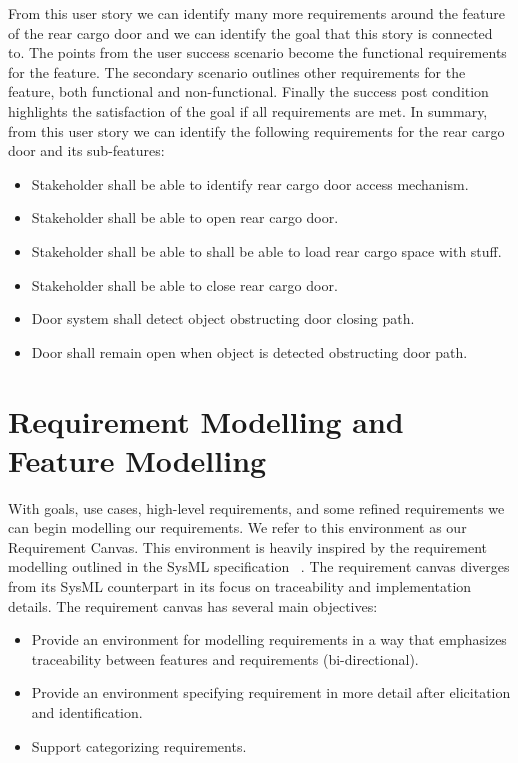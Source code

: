 From this user story we can identify many more requirements around the feature of the rear cargo door and we can identify the goal that this story is connected to. The points from the user success scenario become the functional requirements for the feature. The secondary scenario outlines other requirements for the feature, both functional and non-functional. Finally the success post condition highlights the satisfaction of the goal if all requirements are met. In summary, from this user story we can identify the following requirements for the rear cargo door and its sub-features:
\begin{itemize}
	\item Stakeholder shall be able to identify rear cargo door access mechanism.
	\item Stakeholder shall be able to open rear cargo door.
	\item Stakeholder shall be able to shall be able to load rear cargo space with stuff.
	\item Stakeholder shall be able to close rear cargo door.
	\item Door system shall detect object obstructing door closing path. 
	\item Door shall remain open when object is detected obstructing door path.
\end{itemize}

\section{Requirement Modelling and Feature Modelling}

With goals, use cases, high-level requirements, and some refined requirements we can begin modelling our requirements. We refer to this environment as our Requirement Canvas. This environment is heavily inspired by the requirement modelling outlined in the SysML specification ~\cite{sysml2019omg}. The requirement canvas diverges from its SysML counterpart in its focus on traceability and implementation details. The requirement canvas has several main objectives:
\begin{itemize}
	\item Provide an environment for modelling requirements in a way that emphasizes traceability between features and requirements (bi-directional).
	\item Provide an environment specifying requirement in more detail after elicitation and identification.
	\item Support categorizing requirements.
\end{itemize}  

